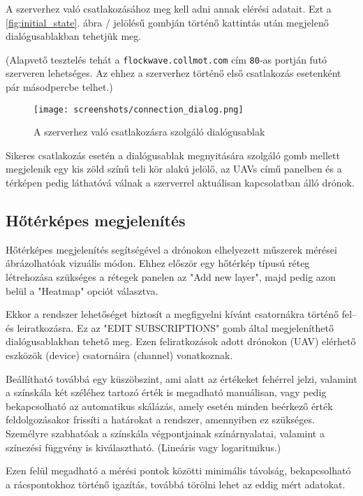 A szerverhez való csatlakozásához meg kell adni annak elérési adatait. Ezt a
\ref{fig:initial_state}. ábra / jelölésű gombján történő kattintás
után megjelenő dialógusablakban tehetjük meg.

(Alapvető tesztelés tehát a \verb|flockwave.collmot.com| cím \verb|80|-as
portján futó szerveren lehetséges. Az ehhez a szerverhez történő első
csatlakozás esetenként pár másodpercbe telhet.)

\begin{figure}[H]
  \center
  \texttt{[image: screenshots/connection\_dialog.png]}
  \caption{A szerverhez való csatlakozásra szolgáló dialógusablak}
  \label{fig:connection_dialog}
\end{figure}

Sikeres csatlakozás esetén a dialógusablak megnyitására szolgáló gomb mellett
megjelenik egy kis zöld színű teli kör alakú jelölő, az UAVs című panelben és a
térképen pedig láthatóvá válnak a szerverrel aktuálisan kapcsolatban álló
drónok.


\subsection{Hőtérképes megjelenítés}

Hőtérképes megjelenítés segítségével a drónokon elhelyezett műszerek mérései
ábrázolhatóak vizuális módon. Ehhez először egy hőtérkép típusú réteg
létrehozása szükséges a rétegek panelen az "Add new layer", majd pedig azon
belül a "Heatmap" opciót választva.

Ekkor a rendszer lehetőséget biztosít a megfigyelni kívánt csatornákra történő
fel-- és leiratkozásra. Ez az "EDIT SUBSCRIPTIONS" gomb által megjeleníthető
dialógusablakban tehető meg. Ezen feliratkozások adott drónokon (UAV) elérhető
eszközök (device) csatornáira (channel) vonatkoznak.

Beállítható továbbá egy küszöbszint, ami alatt az értékeket fehérrel jelzi,
valamint a színskála két széléhez tartozó érték is megadható manuálisan, vagy
pedig bekapcsolható az automatikus skálázás, amely esetén minden beérkező érték
feldolgozásakor frissíti a határokat a rendszer, amennyiben ez szükséges.
Személyre szabhatóak a színskála végpontjainak színárnyalatai, valamint a
színezési függvény is kiválasztható. (Lineáris vagy logaritmikus.)

Ezen felül megadható a mérési pontok közötti minimális távolság, bekapcsolható a
rácspontokhoz történő igazítás, továbbá törölni lehet az eddig mért adatokat.

